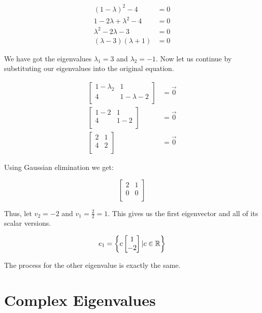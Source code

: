 \begin{align*}
    (1 - \lambda)^2 - 4 &= 0 \\
    1 - 2\lambda + \lambda^2 - 4 &= 0 \\
    \lambda^2 - 2\lambda - 3 &= 0 \\
    (\lambda - 3) (\lambda + 1) &= 0 
\end{align*}

We have got the eigenvalues \(\lambda_1 = 3\) and \(\lambda_2 = -1\). Now let us continue by 
substituting our eigenvalues into the original equation.

\begin{align*}
    \begin{bmatrix} 1 - \lambda_2 & 1 \\ 4 & 1 - \lambda-2 \\ \end{bmatrix} &= \vec{0} \\
    \begin{bmatrix} 1 - 2 & 1 \\ 4 & 1 - 2 \\ \end{bmatrix} &= \vec{0} \\
    \begin{bmatrix} 2 & 1 \\ 4 & 2 \\ \end{bmatrix} &= \vec{0} 
\end{align*}

Using Gaussian elimination we get: 

\[
    \begin{bmatrix} 
        2 & 1 \\ 
        0 & 0 \\ 
    \end{bmatrix} 
\]

Thus, let \(v_2 = -2\) and \(v_1 = \frac{2}{2} = 1\). This gives us the first eigenvector and all of its 
scalar versions.

\[
    e_1 = \left\{ c \begin{bmatrix} 1 \\ -2 \end{bmatrix} | c \in \mathbb{R}\right\}
\]

The process for the other eigenvalue is exactly the same.

\section{Complex Eigenvalues}

